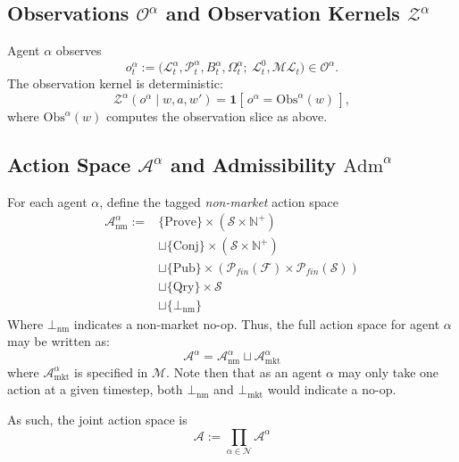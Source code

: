 \documentclass[letterpaper]{article} %
\begin{document}
\subsection{Observations $\mathcal{O}^\alpha$ and Observation Kernels $\mathcal{Z}^\alpha$}


Agent $\alpha$ observes
\[
o^\alpha_t :=
\big(\mathcal{L}^\alpha_t,\mathcal{P}^\alpha_t,B^\alpha_t, \Omega_t^\alpha;\ \mathcal{L}^0_t,\mathcal{ML}_t\big)%
\in\mathcal{O}^\alpha.
\]
The observation kernel is deterministic:
\[
\mathcal{Z}^\alpha(o^\alpha\mid w,a,w')=\mathbf{1}[\,o^\alpha=\mathrm{Obs}^\alpha(w)\,],
\]
where $\mathrm{Obs}^\alpha(w)$ computes the observation slice as above.


\subsection{Action Space $\mathcal{A}^\alpha$ and Admissibility $\mathrm{Adm}^\alpha$}

For each agent $\alpha$, define the tagged \textit{non-market} action space
\begin{align*}
\mathcal{A}_{\mathrm{nm}}^\alpha
:=
&
\{\mathrm{Prove}\}\times(\mathcal{S}\times\mathbb{N}^+)
\\&\sqcup
\{\mathrm{Conj}\}\times(\mathcal{S}\times\mathbb{N}^+)
\\&\sqcup
\{\mathrm{Pub}\}\times(\mathcal{P}_{fin}(\mathcal{F})\times \mathcal{P}_{fin}(\mathcal{S}))
\\&\sqcup
\{\mathrm{Qry}\}\times \mathcal{S}
\\&\sqcup\{\bot_{\mathrm{nm}}\}
\end{align*}
Where $\bot_{\mathrm{nm}}$ indicates a non-market no-op. Thus, the full action space for agent $\alpha$ may be written as:
\[
\mathcal{A}^\alpha = \mathcal{A}^\alpha_{\mathrm{nm}} \sqcup \mathcal{A}^\alpha_{\mathrm{mkt}}
\]
where $\mathcal{A}^\alpha_{\mathrm{mkt}}$ is specified in $\mathscr{M}$. Note then that as an agent $\alpha$ may only take one action at a given timestep, both $\bot_{\mathrm{nm}}$ and $\bot_{\mathrm{mkt}}$ would indicate a no-op.

As such, the joint action space is 
\[\mathcal{A}:=\prod_{\alpha\in\mathcal{N}}\mathcal{A}^\alpha\]
\end{document}
